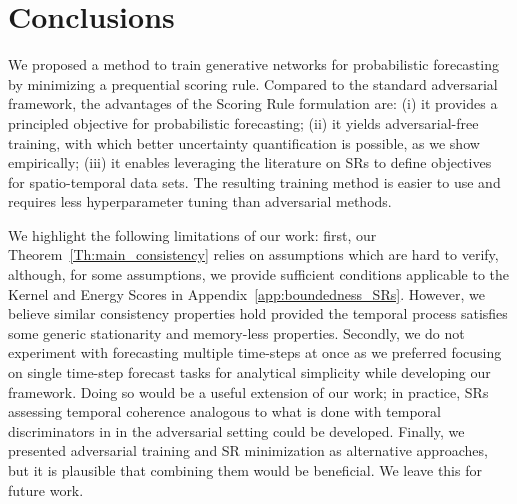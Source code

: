 \documentclass[twoside,11pt]{article}
\begin{document}
	\section{Conclusions}\label{sec:conclusions}
	We proposed a method to train generative networks for probabilistic forecasting by minimizing a prequential scoring rule. 
	Compared to the standard adversarial framework, the advantages of the Scoring Rule formulation are: (i) it provides a principled objective for probabilistic forecasting; (ii) it yields adversarial-free training, with which better uncertainty quantification is possible, as we show empirically; (iii) it enables leveraging the literature on SRs to define objectives for spatio-temporal data sets. 
	The resulting training method is easier to use and requires less hyperparameter tuning than adversarial methods.
	
	We highlight the following limitations of our work: first, our Theorem~\ref{Th:main_consistency} relies on assumptions which are hard to verify, although, for some assumptions, we provide sufficient conditions applicable to the Kernel and Energy Scores in Appendix~\ref{app:boundedness_SRs}. However, we believe similar consistency properties hold provided the temporal process satisfies some generic stationarity and memory-less properties. Secondly, we do not experiment with forecasting multiple time-steps at once as we preferred focusing on single time-step forecast tasks for  analytical simplicity while developing our framework.
	Doing so would be a useful extension of our work; in practice, SRs assessing temporal coherence analogous to what is done with temporal discriminators in \cite{ravuri2021skillful} in the adversarial setting could be developed. Finally, we presented adversarial training and SR minimization as alternative approaches, but it is plausible that combining them would be beneficial. We leave this for future work.
	
	
	
	
	\newpage
	
\end{document}
